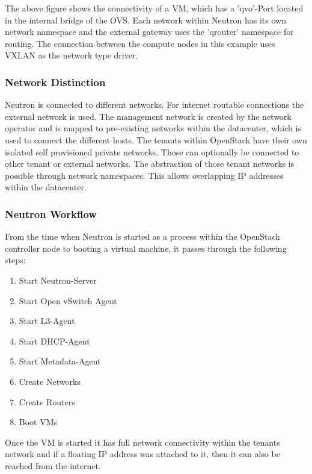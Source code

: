 The above figure shows the connectivity of a VM, which has a 'qvo'-Port located in the internal bridge of the OVS. Each network within Neutron has its own network namespace and the external gateway uses the 'qrouter' namespace for routing. The connection between the compute nodes in this example uses VXLAN as the network type driver.


\subsubsection{Network Distinction}

Neutron is connected to different networks. For internet routable connections the external network is used. The management network is created by the network operator and is mapped to pre-existing networks within the datacenter, which is used to connect the different hosts. The tenants within OpenStack have their own isolated self provisioned private networks. Those can optionally be connected to other tenant or external networks. The abstraction of those tenant networks is possible through network namespaces. This allows overlapping IP addresses within the datacenter.


\subsubsection{Neutron Workflow}

From the time when Neutron is started as a process within the OpenStack controller node to booting a virtual machine, it passes through the following steps:

\begin{enumerate}
\item Start Neutron-Server
\item Start Open vSwitch Agent
\item Start L3-Agent
\item Start DHCP-Agent
\item Start Metadata-Agent
\item Create Networks
\item Create Routers
\item Boot VMs
\end{enumerate}

Once the VM is started it has full network connectivity within the tenants network and if a floating IP address was attached to it, then it can also be reached from the internet.

